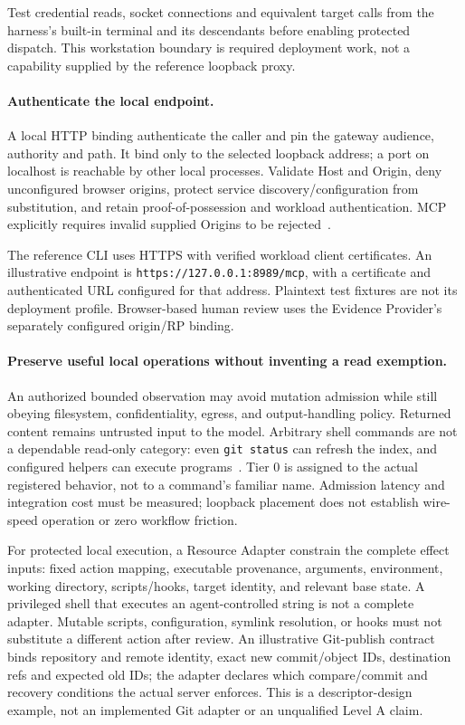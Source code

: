 Test credential reads, socket connections and equivalent target calls from the harness's built-in terminal and its descendants before enabling protected dispatch. This workstation boundary is required deployment work, not a capability supplied by the reference loopback proxy.

\paragraph{Authenticate the local endpoint.}
A local HTTP binding  authenticate the caller and pin the gateway audience, authority and path. It  bind only to the selected loopback address; a port on localhost is reachable by other local processes. Validate Host and Origin, deny unconfigured browser origins, protect service discovery/configuration from substitution, and retain proof-of-possession and workload authentication. MCP explicitly requires invalid supplied Origins to be rejected~\cite{mcphttp2026}.

The reference CLI uses HTTPS with verified workload client certificates. An illustrative endpoint is \texttt{https://127.0.0.1:8989/mcp}, with a certificate and authenticated URL configured for that address. Plaintext test fixtures are not its deployment profile. Browser-based human review uses the Evidence Provider's separately configured origin/RP binding.

\paragraph{Preserve useful local operations without inventing a read exemption.}
An authorized bounded observation may avoid mutation admission while still obeying filesystem, confidentiality, egress, and output-handling policy. Returned content remains untrusted input to the model. Arbitrary shell commands are not a dependable read-only category: even \texttt{git status} can refresh the index, and configured helpers can execute programs~\cite{gitstatus2026,gitconfig2026}. Tier 0 is assigned to the actual registered behavior, not to a command's familiar name. Admission latency and integration cost must be measured; loopback placement does not establish wire-speed operation or zero workflow friction.

For protected local execution, a Resource Adapter  constrain the complete effect inputs: fixed action mapping, executable provenance, arguments, environment, working directory, scripts/hooks, target identity, and relevant base state. A privileged shell that executes an agent-controlled string is not a complete adapter. Mutable scripts, configuration, symlink resolution, or hooks must not substitute a different action after review. An illustrative Git-publish contract binds repository and remote identity, exact new commit/object IDs, destination refs and expected old IDs; the adapter declares which compare/commit and recovery conditions the actual server enforces. This is a descriptor-design example, not an implemented Git adapter or an unqualified Level A claim.


